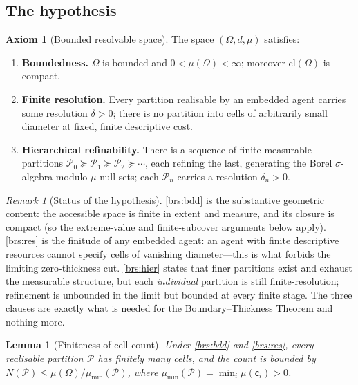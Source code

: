 \documentclass[11pt,twocolumn,a4paper]{article}
\theoremstyle{thmstyle}
\newtheorem{lemma}[theorem]{Lemma}
\theoremstyle{definition}
\newtheorem{axiom}{Axiom}
\theoremstyle{remark}
\newtheorem{remark}[theorem]{Remark}
\newcommand{\Space}{\Omega}
\newcommand{\cl}{\mathrm{cl}}
\newcommand{\reso}{\delta}
\newcommand{\Part}{\mathscr{P}}
\newcommand{\cell}{\mathsf{c}}
\begin{document}
\subsection{The hypothesis}

\begin{axiom}[Bounded resolvable space]
\label{ax:brs}
The space $(\Space,d,\mu)$ satisfies:
\begin{enumerate}[label=\textup{(BRS\arabic*)},leftmargin=3.2em]
\item\label{brs:bdd} \textbf{Boundedness.} $\Space$ is bounded and
$0<\mu(\Space)<\infty$; moreover $\cl(\Space)$ is compact.
\item\label{brs:res} \textbf{Finite resolution.} Every partition realisable by
an embedded agent carries some resolution $\reso>0$; there is no partition into
cells of arbitrarily small diameter at fixed, finite descriptive cost.
\item\label{brs:hier} \textbf{Hierarchical refinability.} There is a sequence of
finite measurable partitions $\Part_0\succeq\Part_1\succeq\Part_2\succeq\cdots$,
each refining the last, generating the Borel $\sigma$-algebra modulo $\mu$-null
sets; each $\Part_n$ carries a resolution $\reso_n>0$.
\end{enumerate}
\end{axiom}

\begin{remark}[Status of the hypothesis]
\label{rem:brs-status}
\ref{brs:bdd} is the substantive geometric content: the accessible space is
finite in extent and measure, and its closure is compact (so the
extreme-value and finite-subcover arguments below apply). \ref{brs:res} is the
finitude of any embedded agent: an agent with finite descriptive resources
cannot specify cells of vanishing diameter---this is what forbids the limiting
zero-thickness cut. \ref{brs:hier} states that finer partitions exist and
exhaust the measurable structure, but each \emph{individual} partition is still
finite-resolution; refinement is unbounded in the limit but bounded at every
finite stage. The three clauses are exactly what is needed for the
Boundary--Thickness Theorem and nothing more.
\end{remark}

\begin{lemma}[Finiteness of cell count]
\label{lem:finite-cells}
Under \ref{brs:bdd} and \ref{brs:res}, every realisable partition $\Part$ has
finitely many cells, and the count is bounded by
$N(\Part)\le \mu(\Space)/\mu_{\min}(\Part)$, where
$\mu_{\min}(\Part)=\min_i\mu(\cell_i)>0$.
\end{lemma}
\end{document}
